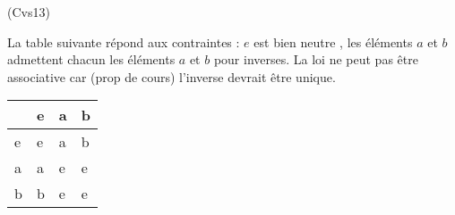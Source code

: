\begin{tiny}(Cvs13)\end{tiny} La table suivante répond aux contraintes : $e$ est bien neutre , les éléments $a$ et $b$ admettent chacun les éléments $a$ et $b$ pour inverses. La loi ne peut pas être associative car (prop de cours) l'inverse devrait être unique. 
\begin{center}
\begin{tabular}{l|l|l|l|}
 & e & a & b \\ \hline
e & e & a & b \\ \hline 
a & a & e & e \\ \hline
b & b & e & e \\ \hline
\end{tabular}
\end{center}
